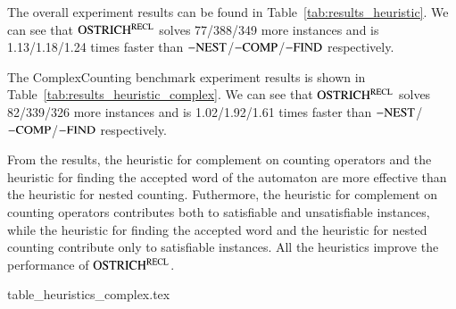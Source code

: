 The overall experiment results can be found in Table~\ref{tab:results_heuristic}. We can see that $\rm OSTRICH^{RECL}$ solves 77/388/349 more instances and is 1.13/1.18/1.24 times faster than ${\rm -NEST}$/${\rm -COMP}$/${\rm -FIND}$ respectively. 

The ComplexCounting benchmark experiment results is shown in Table~\ref{tab:results_heuristic_complex}. We can see that $\rm OSTRICH^{RECL}$ solves 82/339/326 more instances and is 1.02/1.92/1.61 times faster than ${\rm -NEST}$/${\rm -COMP}$/${\rm -FIND}$ respectively.

From the results, the heuristic for complement on counting operators and the heuristic for finding the accepted word of the automaton are more effective than the heuristic for nested counting. Futhermore, the heuristic for complement on counting operators contributes both to satisfiable and unsatisfiable instances, while the heuristic for finding the accepted word and the heuristic for nested counting contribute only to satisfiable instances.
All the heuristics improve the performance of $\rm OSTRICH^{RECL}$.

\begin{table}
  {table_heuristics_complex.tex}
  \caption{Empirical justification of the heuristics on ComplexCounting benchmarks}\label{tab:results_heuristic_complex}
\end{table}


